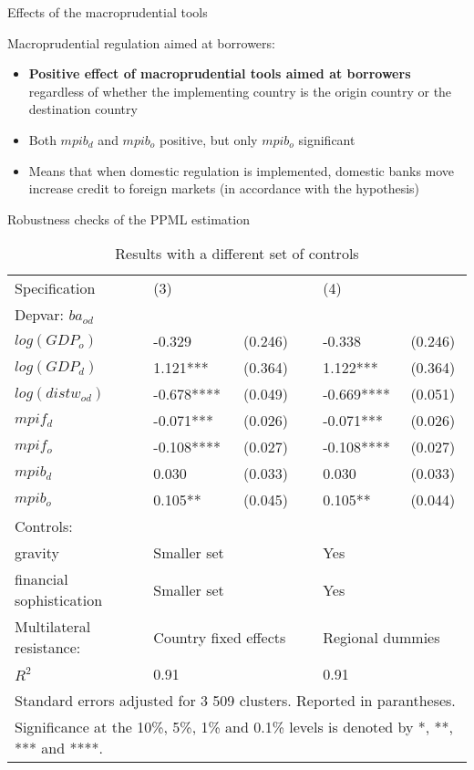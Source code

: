 \documentclass{beamer}
\begin{document}
\begin{frame}{Effects of the macroprudential tools}
    \begin{block}{Macroprudential regulation aimed at borrowers:}
    \begin{itemize}
        \item \textbf{Positive effect of macroprudential tools aimed at borrowers} regardless of whether the implementing country is the origin country or the destination country
        \item Both $mpib_{d}$ and $mpib_{o}$ positive, but only $mpib_{o}$ significant
        \item Means that when domestic regulation is implemented, domestic banks move increase credit to foreign markets (in accordance with the hypothesis)
    \end{itemize}
    \end{block}
\end{frame}


\begin{frame}{Robustness checks of the PPML estimation}
\begin{table}[!h]
\tiny
\centering
\begin{tabular}{ l l l l l l}
\hline
Specification&(3)&&&(4)& \\
Depvar: $ba_{od}$&&&&&\\
\hline
$log(GDP_{o})$&-0.329&(0.246)&&-0.338&(0.246)\\
$log(GDP_{d})$&1.121***&(0.364)&&1.122***&(0.364)\\
$log(distw_{od})$&-0.678****&(0.049)&&-0.669****&(0.051)\\
$mpif_{d}$&-0.071***&(0.026)&&-0.071***&(0.026)\\
$mpif_{o}$&-0.108****&(0.027)&&-0.108****&(0.027)\\
$mpib_{d}$&0.030&(0.033)&&0.030&(0.033)\\
$mpib_{o}$&0.105**&(0.045)&&0.105**&(0.044)\\
Controls:&&&&&\\
gravity &Smaller set&&&Yes& \\ 
financial sophistication &Smaller set&&&Yes& \\
Multilateral resistance: & \multicolumn{2}{l}{Country fixed effects} && \multicolumn{2}{l}{Regional dummies} \\
\hline
$R^2$&0.91&&&0.91&\\
\hline
\multicolumn{6}{l}{Standard errors adjusted for 3 509 clusters. Reported in parantheses. }\\
\hline
\multicolumn{6}{l}{\tiny Significance at the 10\%, 5\%, 1\% and 0.1\% levels is denoted by *, **, *** and ****.}\\
\end{tabular}
\caption{Results with a different set of controls}
\label{tab:robust1}
\end{table}
\end{frame}
\end{document}
